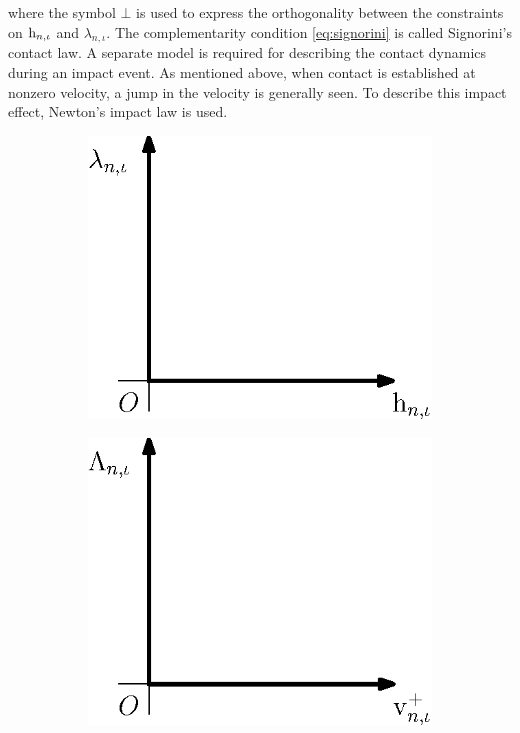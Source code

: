 \documentclass[../DC2019003Bouma.tex]{subfiles}
\begin{document}
where the symbol $\bot$ is used to express the orthogonality between the constraints on $\mathrm{h}_{n,\iota}$ and $\lambda_{n,\iota}$. The complementarity condition \eqref{eq:signorini} is called Signorini's contact law. A separate model is required for describing the contact dynamics during an impact event. As mentioned above, when contact is established at nonzero velocity, a jump in the velocity is generally seen. To describe this impact effect, Newton's impact law is used.
\begin{figure}[bt!]
\centering
\begin{subfigure}{0.3\textwidth}
\centering
\includegraphics[width=\linewidth]{signorinicontact.eps}
\caption{}\label{fig:signorinicontact}
\end{subfigure}
\qquad
\begin{subfigure}{0.3\textwidth}
\centering
\includegraphics[width=\linewidth]{newtonimpact.eps}

\end{subfigure}
\end{figure}
\end{document}
